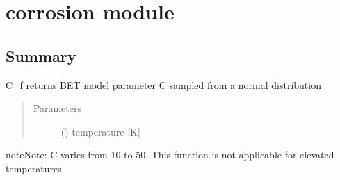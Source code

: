 \documentclass[letterpaper,10pt,english]{sphinxmanual}
\begin{document}
\section{corrosion module}
\label{\detokenize{corrosion:module-corrosion}}\label{\detokenize{corrosion:corrosion-module}}\label{\detokenize{corrosion::doc}}

\subsection{Summary}
\label{\detokenize{corrosion:summary}}

\begin{fulllineitems}
\label{\detokenize{corrosion:corrosion.C_f}}
\sphinxAtStartPar
C\_f returns BET model parameter C sampled from a normal distribution
\begin{quote}\begin{description}
\item[{Parameters}] \leavevmode
\sphinxAtStartPar
{} () \textendash{} temperature {[}K{]}

\end{description}\end{quote}

\begin{sphinxadmonition}{note}{Note:}
\sphinxAtStartPar
C varies from 10 to 50. This function is not applicable for elevated temperatures
\end{sphinxadmonition}

\end{fulllineitems}

\end{document}
